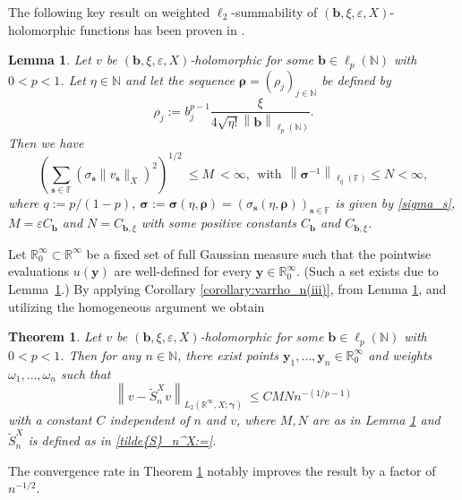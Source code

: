 \documentclass[11pt]{article}
\newtheorem{theorem}{Theorem}[section]
\newtheorem{lemma}{Lemma}[section]
\numberwithin{equation}{section}
\theoremstyle{definition}
\theoremstyle{remark}
\newcommand{\norm}[2]{\left\|{#1}\right\|_{#2}}
\newcommand{\bb}{{\boldsymbol{b}}}
\newcommand{\bs}{{\boldsymbol{s}}}
\newcommand{\by}{{\boldsymbol{y}}}
\newcommand{\bgamma}{{\boldsymbol{\gamma}}}
\newcommand{\brho}{{\boldsymbol{\rho}}}
\newcommand{\bsigma}{{\boldsymbol{\sigma}}}
\def\NN{{\mathbb N}}
\def\NN{{\mathbb N}}
\def\FF{{\mathcal F}}
\def\RRi{{\mathbb R}^\infty}
\def\FF{{\mathcal F}}
\def\NN{{\mathbb N}}
\def\FF{{\mathbb F}}
\begin{document}
{The following key result on weighted $\ell_2$-summability of $(\bb,\xi,\varepsilon,X)$-holomorphic functions has been proven in \cite[ Theorem 4.9]{DNSZ2023}.
\begin{lemma} \label{lemma:weighted summability, holomorphic} Let $v$ be
	$(\bb,\xi,\varepsilon,X)$-holomorphic for some $\bb\in \ell_p(\NN)$ with $0< p <1$. Let $\eta\in\NN$ and let the sequence $\brho=(\rho_j)_{j \in \NN}$ be defined by
	$$
{\rho_j:=b_j^{p-1}\frac{\xi}{4\sqrt{\eta!}\norm{\bb}{\ell_p(\NN)}}.}
	$$
Then we have 
	\begin{equation*} \label{ell_2-summability}
		\left(\sum_{\bs\in\FF} (\sigma_\bs \|v_\bs\|_{X})^2\right)^{1/2} \ \le M \ <\infty, \ \ \text{with} \ \
		\norm{\bsigma^{-1}}{\ell_q(\FF)} \le N < \infty,
	\end{equation*}	
	where $q := p/(1-p)$,
{$\bsigma:=\bsigma(\eta,\brho)=(\sigma_\bs(\eta,\brho))_{\bs \in \FF}$ is given by \eqref{sigma_s}, 
	$M= \varepsilon C_{\bb}$ and
	$N= C_{\bb,\xi}$  with some positive constants $C_{\bb}$ and $C_{\bb,\xi}$.}
\end{lemma}

{Let $\RRi_0 \subset \RRi$ be a fixed set of full Gaussian measure such  that the pointwise evaluations  $u(\by)$ are  well-defined for every $\by \in \RRi_0$. (Such a set exists due to 
	Lemma~\ref{lemma:weighted summability, holomorphic}.)} By applying Corollary \ref{corollary:varrho_n(iii)}, from Lemma \ref{lemma:weighted summability, holomorphic}, and utilizing the homogeneous argument we obtain
 
 \begin{theorem}\label{theorem:sampling-lognormal-holomorphic} 
 	Let $v$ be
 	$(\bb,\xi,\varepsilon,X)$-holomorphic for some $\bb\in \ell_p(\NN)$ with 
 	$0< p <1$. 
     Then for any $n \in\NN$, there exist points 
$\by_1, \dots, \by_n \in \RRi_0$ and weights  $\omega_1, \dots, \omega_n$ such that 
 	\begin{equation} \label{bound1}
 		{\norm{v - \tilde{S}_n^X v}{L_2(\RRi,X; \bgamma)}}
 		\ \le C MN n^{-(1/p - 1)}
 	\end{equation}
 	with a constant $C$ independent of $n$ and {$v$},  	
 	where 
 	 $M,N$ are as in Lemma \ref{lemma:weighted summability, holomorphic} and
 	 $\tilde{S}_n^X$ is defined as in \eqref{tilde{S}_n^X:=}. 
 	\end{theorem}
 	
 	
    The convergence rate in Theorem \ref{theorem:sampling-lognormal-holomorphic} notably improves the result \cite[Theorem 6.13]{DNSZ2023} by a factor of $n^{-1/2}$.
 		
}
\end{document}
